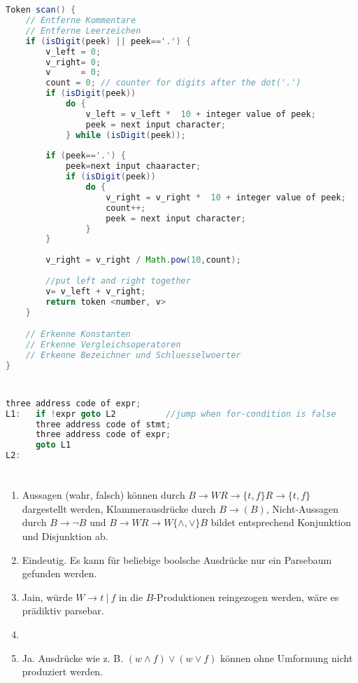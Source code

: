 \documentclass[a4paper,10pt]{scrartcl}
\begin{document}
\section{}
\begin{lstlisting}[language=Java,mathescape=True]
Token scan() {
    // Entferne Kommentare
    // Entferne Leerzeichen    
    if (isDigit(peek) || peek=='.') {
        v_left = 0;
        v_right= 0;
        v	   = 0;
        count = 0; // counter for digits after the dot('.')
        if (isDigit(peek))
            do {
                v_left = v_left *  10 + integer value of peek;
                peek = next input character;
            } while (isDigit(peek));
        
        if (peek=='.') {
            peek=next input chaaracter;
            if (isDigit(peek))
                do {
                    v_right = v_right *  10 + integer value of peek;
                    count++;
                    peek = next input character;
                }
        }
        
        v_right = v_right / Math.pow(10,count);
        
        //put left and right together
        v= v_left + v_right;
        return token <number, v>
    }

    // Erkenne Konstanten
    // Erkenne Vergleichsoperatoren 
    // Erkenne Bezeichner und Schluesselwoerter
}
\end{lstlisting}
\section{}
\begin{lstlisting}[language=Java]
	  three address code of expr;
L1:   if !expr goto L2      	//jump when for-condition is false
      three address code of stmt;
	  three address code of expr;
      goto L1
L2:
\end{lstlisting}
\section{}
\begin{enumerate}
\item   Aussagen (wahr, falsch) können durch $B \to WR \to \{t,f\}R \to \{t,f\}$ dargestellt werden, Klammerausdrücke durch $B \to (B)$, Nicht-Aussagen durch $B \to \neg B$ und $B \to WR \to W\{\land,\lor\}B$ bildet entsprechend Konjunktion und Disjunktion ab.
\item   Eindeutig. Es kann für beliebige boolsche Ausdrücke nur ein Parsebaum gefunden werden.
\item   Jain, würde $W \to t\ |\ f$ in die $B$-Produktionen reingezogen werden, wäre es prädiktiv parsebar.
\item   
\item   Ja. Ausdrücke wie z. B. $(w \land f) \lor (w \lor f)$ können ohne Umformung nicht produziert werden.
\end{enumerate}
\end{document}
